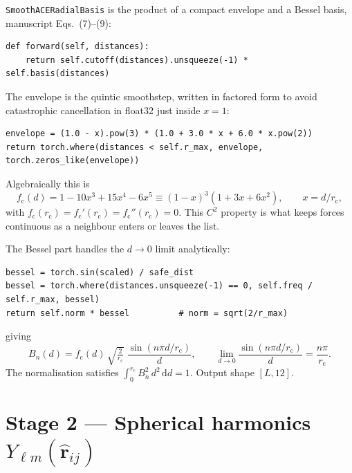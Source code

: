 \documentclass[11pt,a4paper]{article}
\newcommand{\code}[1]{\texttt{\small #1}}
\begin{document}
\code{SmoothACERadialBasis} is the product of a compact envelope and a Bessel
basis, manuscript Eqs.~(7)--(9):

\begin{lstlisting}
def forward(self, distances):
    return self.cutoff(distances).unsqueeze(-1) * self.basis(distances)
\end{lstlisting}

The envelope is the quintic smoothstep, written in factored form to avoid
catastrophic cancellation in float32 just inside $x=1$:

\begin{lstlisting}
envelope = (1.0 - x).pow(3) * (1.0 + 3.0 * x + 6.0 * x.pow(2))
return torch.where(distances < self.r_max, envelope, torch.zeros_like(envelope))
\end{lstlisting}

Algebraically this is
\begin{equation}
f_{\mathrm c}(d) = 1 - 10x^3 + 15x^4 - 6x^5 \equiv (1-x)^3(1+3x+6x^2),
\qquad x = d/r_{\mathrm c},
\end{equation}
with $f_{\mathrm c}(r_{\mathrm c}) = f_{\mathrm c}'(r_{\mathrm c}) =
f_{\mathrm c}''(r_{\mathrm c}) = 0$. This $C^2$ property is what keeps forces
continuous as a neighbour enters or leaves the list.

The Bessel part handles the $d\to0$ limit analytically:

\begin{lstlisting}
bessel = torch.sin(scaled) / safe_dist
bessel = torch.where(distances.unsqueeze(-1) == 0, self.freq / self.r_max, bessel)
return self.norm * bessel          # norm = sqrt(2/r_max)
\end{lstlisting}

giving
\begin{equation}
B_n(d) = f_{\mathrm c}(d)\,\sqrt{\tfrac{2}{r_{\mathrm c}}}\;
\frac{\sin(n\pi d/r_{\mathrm c})}{d},
\qquad
\lim_{d\to0}\frac{\sin(n\pi d/r_{\mathrm c})}{d} = \frac{n\pi}{r_{\mathrm c}} .
\end{equation}
The normalisation satisfies $\int_0^{r_{\mathrm c}} B_n^2\,d^2\,\mathrm dd = 1$.
Output shape $[L,12]$.

\section{Stage 2 --- Spherical harmonics \texorpdfstring{$Y_{\ell m}(\hat{\bm r}_{ij})$}{Ylm}}
\end{document}
